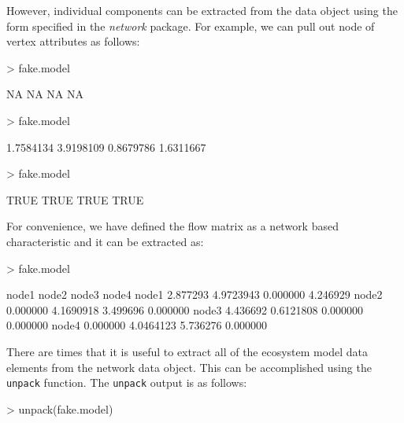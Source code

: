 \documentclass[11pt]{article}
\begin{document}
However, individual components can be extracted from the data object
using the form specified in the \textit{network} package.  For
example, we can pull out node of vertex attributes as follows:

\begin{Schunk}
\begin{Sinput}
> fake.model%
\end{Sinput}
\begin{Soutput}
[1] NA NA NA NA
\end{Soutput}
\begin{Sinput}
> fake.model%
\end{Sinput}
\begin{Soutput}
[1] 1.7584134 3.9198109 0.8679786 1.6311667
\end{Soutput}
\begin{Sinput}
> fake.model%
\end{Sinput}
\begin{Soutput}
[1] TRUE TRUE TRUE TRUE
\end{Soutput}
\end{Schunk}

For convenience, we have defined the flow matrix as a network based
characteristic and it can be extracted as:
\begin{Schunk}
\begin{Sinput}
> fake.model%
\end{Sinput}
\begin{Soutput}
         node1     node2    node3    node4
node1 2.877293 4.9723943 0.000000 4.246929
node2 0.000000 4.1690918 3.499696 0.000000
node3 4.436692 0.6121808 0.000000 0.000000
node4 0.000000 4.0464123 5.736276 0.000000
\end{Soutput}
\end{Schunk}

There are times that it is useful to extract all of the ecosystem
model data elements from the network data object.  This can be
accomplished using the \texttt{unpack} function. The \texttt{unpack}
output is as follows:

\begin{Schunk}
\begin{Sinput}
> unpack(fake.model)  
\end{Sinput}
\end{Schunk}
\end{document}
